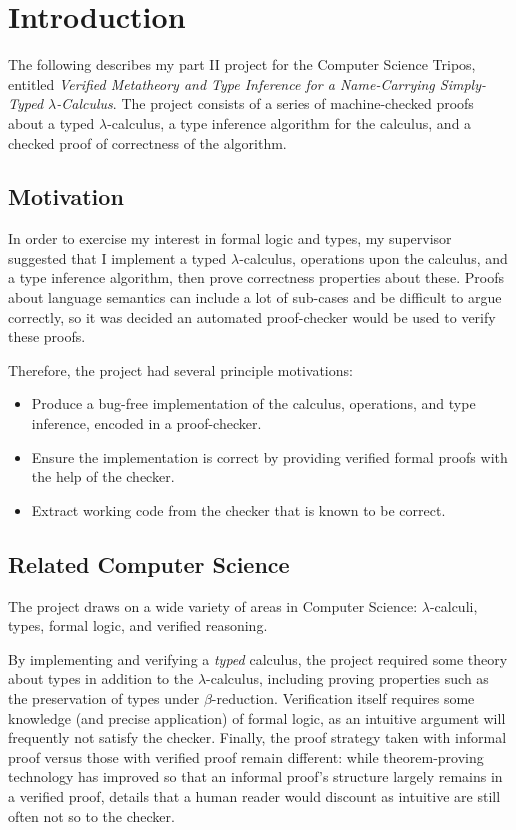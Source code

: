 \chapter{Introduction}
The following describes my part II project for the Computer Science Tripos, entitled \emph{Verified Metatheory and Type Inference for a Name-Carrying Simply-Typed \(\lambda\)-Calculus}.
The project consists of a series of machine-checked proofs about a typed \(\lambda\)-calculus, a type inference algorithm for the calculus, and a checked proof of correctness of the algorithm.

\section{Motivation}
In order to exercise my interest in formal logic and types, my supervisor suggested that I implement a typed \(\lambda\)-calculus, operations upon the calculus, and a type inference algorithm, then prove correctness properties about these.
Proofs about language semantics can include a lot of sub-cases and be difficult to argue correctly, so it was decided an automated proof-checker would be used to verify these proofs.

Therefore, the project had several principle motivations:
\begin{itemize}
\item
Produce a bug-free implementation of the calculus, operations, and type inference, encoded in a proof-checker.
\item
Ensure the implementation is correct by providing verified formal proofs with the help of the checker.
\item
Extract working code from the checker that is known to be correct.
\end{itemize}

\section{Related Computer Science}
The project draws on a wide variety of areas in Computer Science: \(\lambda\)-calculi, types, formal logic, and verified reasoning.

By implementing and verifying a \emph{typed} calculus, the project required some theory about types in addition to the \(\lambda\)-calculus, including proving properties such as the preservation of types under \(\beta\)-reduction.
Verification itself requires some knowledge (and precise application) of formal logic, as an intuitive argument will frequently not satisfy the checker.
Finally, the proof strategy taken with informal proof versus those with verified proof remain different: while theorem-proving technology has improved so that an informal proof's structure largely remains in a verified proof, details that a human reader would discount as intuitive are still often not so to the checker.

